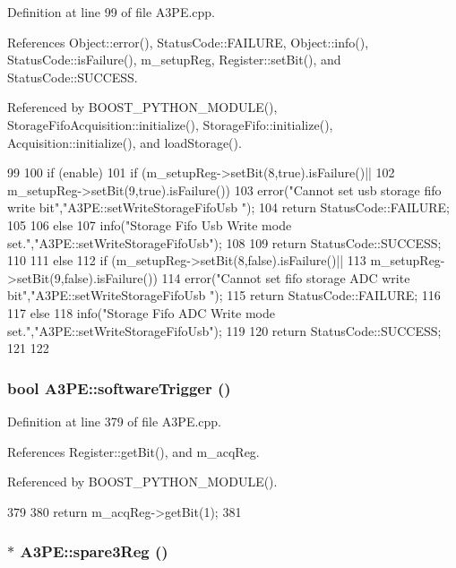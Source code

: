 Definition at line 99 of file A3PE.cpp.

References Object::error(), StatusCode::FAILURE, Object::info(), StatusCode::isFailure(), m\_\-setupReg, Register::setBit(), and StatusCode::SUCCESS.

Referenced by BOOST\_\-PYTHON\_\-MODULE(), StorageFifoAcquisition::initialize(), StorageFifo::initialize(), Acquisition::initialize(), and loadStorage().


\begin{DoxyCode}
99                                                   {
100   if (enable) {
101     if (m_setupReg->setBit(8,true).isFailure()||
102         m_setupReg->setBit(9,true).isFailure()){
103       error("Cannot set usb storage fifo write bit","A3PE::setWriteStorageFifoUsb
      ");
104       return StatusCode::FAILURE;
105     }
106     else {
107       info("Storage Fifo Usb Write mode set.","A3PE::setWriteStorageFifoUsb");
108     }
109     return StatusCode::SUCCESS;
110   }
111   else {
112     if (m_setupReg->setBit(8,false).isFailure()||
113         m_setupReg->setBit(9,false).isFailure()){
114       error("Cannot set fifo storage ADC write bit","A3PE::setWriteStorageFifoUsb
      ");
115       return StatusCode::FAILURE;
116     }
117     else {
118       info("Storage Fifo ADC Write mode set.","A3PE::setWriteStorageFifoUsb");
119     }
120     return StatusCode::SUCCESS;
121   }
122 }
\end{DoxyCode}
\hypertarget{classA3PE_acb2ccd6b78b39a0a9e360439b3b6f4c7}{
\subsubsection[{softwareTrigger}]{\setlength{\rightskip}{0pt plus 5cm}bool A3PE::softwareTrigger ()}}
\label{classA3PE_acb2ccd6b78b39a0a9e360439b3b6f4c7}


Definition at line 379 of file A3PE.cpp.

References Register::getBit(), and m\_\-acqReg.

Referenced by BOOST\_\-PYTHON\_\-MODULE().


\begin{DoxyCode}
379                           {
380   return m_acqReg->getBit(1);
381 }
\end{DoxyCode}
\hypertarget{classA3PE_a979a9ac462eb55e611f6de4e94bad18e}{
\subsubsection[{spare3Reg}]{$\ast$ A3PE::spare3Reg ()}}
\label{classA3PE_a979a9ac462eb55e611f6de4e94bad18e}


